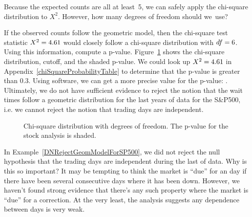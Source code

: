 \begin{exercisewrap}
\begin{nexercise}
Because the expected counts are all at least~5,
we can safely apply the chi-square distribution to $X^2$.
However, how many degrees of freedom should
we~use?\footnotemark
\end{nexercise}
\end{exercisewrap}

\begin{examplewrap}
\begin{nexample}{If the observed counts follow the
    geometric model, then the chi-square test statistic
    $X^2 = 4.61{}$ would closely follow a chi-square
    distribution with $df = 6{}$.
    Using this information, compute a p-value.} 
  \label{DNRejectGeomModelForSP500}%
  Figure~\ref{geomFitPValueForSP500} shows the
  chi-square distribution, cutoff, and the shaded p-value.
  We could look up $X^2 = 4.61{}$ in
  Appendix~\ref{chiSquareProbabilityTable} to determine
  that the p-value is greater than 0.3.
  Using software, we can get a more precise value for
  the p-value: \spdaysPvalue{}.
  Ultimately, we do not have sufficient evidence to reject
  the notion that the wait times follow a geometric
  distribution for the last \spyears{} years of data
  for the S\&P500,
  i.e. we cannot reject the notion that trading days
  are independent.
\end{nexample}
\end{examplewrap}

\begin{figure}[h]
  \centering
  \caption{Chi-square distribution with \spdaysDF{}
      degrees of freedom.
      The p-value for the stock analysis is shaded.}
  \label{geomFitPValueForSP500}
\end{figure}

\begin{examplewrap}
\begin{nexample}{In
    Example~\ref{DNRejectGeomModelForSP500},
    we did not reject the null hypothesis that the trading days
    are independent during the last \spyears{} of data.
    Why is this so important?}
  It may be tempting to think the market is ``due'' for
  an  day if there have been several consecutive
  days where it has been down.
  However, we haven't found strong evidence that there's
  any such property where the market is ``due'' for
  a correction.
  At the very least, the analysis suggests any dependence
  between days is very weak.
\end{nexample}
\end{examplewrap}

